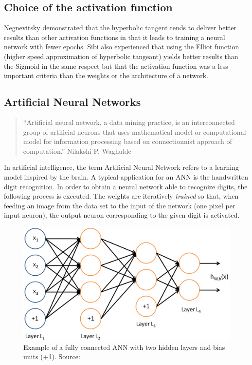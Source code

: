 \documentclass[a4paper,12pt, oneside]{memoir}
\begin{document}
\subsection{Choice of the activation function}

Negnevitsky \cite{negnevitsky-2011} demonstrated that the hyperbolic tangent tends to deliver better results than other activation functions in that it leads to training a neural network with fewer epochs. Sibi \cite{sibi-2013} also experienced that using the Elliot function (higher speed approximation of hyperbolic tangeant) yields better results than the Sigmoid in the same respect but that the activation function was a less important criteria than the weights or the architecture of a network.

\subsection{Artificial Neural Networks}
\label{sec:artificial-neural-network}

\begin{quotation}
``Artificial neural network, a data mining practice, is an interconnected group of artificial neurons that uses mathematical model or computational model for information processing based on connectionnist approach of computation.'' Nilakshi P. Waghulde\cite{waghulde-2014}
\end{quotation}

In artificial intelligence, the term Artificial Neural Network refers to a learning model inspired by the brain. A typical application for an ANN is the handwritten digit recognition. In order to obtain a neural network able to recognize digits, the following process is executed. The weights are iteratively \textit{trained} so that, when feeding an image from the data set to the input of the network (one pixel per input neuron), the output neuron corresponding to the given digit is activated.

\begin{figure}[h]
  \begin{center}
    \includegraphics[scale=0.65]{neural-net-diagram}
  \end{center}
  \caption{Example of a fully connected ANN with two hidden layers and bias units (+1). Source: \cite{coursera-machine-learning-stanford}}
  \label{neural-network-example}
\end{figure}
\end{document}
